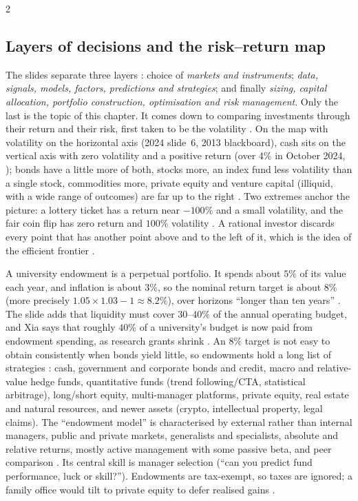\begin{paracol}{2}
\subsection{Layers of decisions and the risk--return map}
The slides separate three layers : choice of \emph{markets and instruments};
\emph{data, signals, models, factors, predictions and strategies}; and finally \emph{sizing, capital allocation,
portfolio construction, optimisation and risk management}. Only the last is the topic of this chapter. It comes
down to comparing investments through their return and their risk, first taken to be the volatility
. On the map with volatility on the horizontal axis (2024 slide~6, 2013 blackboard),
cash sits on the vertical axis with zero volatility and a positive return (over 4\% in October 2024,
); bonds have a little more of both, stocks more, an index fund less volatility than a single stock,
commodities more, private equity and venture capital (illiquid, with a wide range of outcomes) are far up to the
right . Two extremes anchor the picture: a lottery ticket has a
return near $-100\%$ and a small volatility, and the fair coin flip has zero return and $100\%$ volatility
. A rational investor discards every point that has another point above and to the left of
it, which is the idea of the efficient frontier .

\begin{finance}
A university endowment is a perpetual portfolio. It spends about $5\%$ of its value each year, and inflation is
about $3\%$, so the nominal return target is about $8\%$ (more precisely $1.05\times1.03-1\approx8.2\%$),
over horizons ``longer than ten years'' . The slide adds that liquidity
must cover $30$--$40\%$ of the annual operating budget, and Xia says that roughly $40\%$ of a university's budget is now
paid from endowment spending, as research grants shrink . An $8\%$ target is not easy to obtain
consistently when bonds yield little, so endowments hold a long list of strategies : cash,
government and corporate bonds and credit, macro and relative-value hedge funds, quantitative funds (trend
following/CTA, statistical arbitrage), long/short equity, multi-manager platforms, private equity, real estate and
natural resources, and newer assets (crypto, intellectual property, legal claims). The ``endowment model'' is
characterised by external rather than internal managers, public and private markets, generalists and specialists,
absolute and relative returns, mostly active management with some passive beta, and peer comparison
. Its central skill is manager selection (``can you predict fund performance,
luck or skill?''). Endowments are tax-exempt, so taxes are ignored; a family office would tilt to
private equity to defer realised gains .
\end{finance}


\end{paracol}
